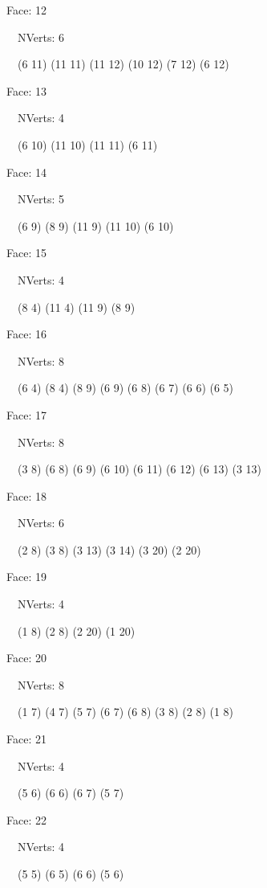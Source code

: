 \documentclass{article}
\begin{document}
{\footnotesize 

Face: 12

\   \    NVerts: 6

 \   \   (6 11) (11 11) (11 12) (10 12) (7 12) (6 12)}

{\footnotesize 

Face: 13

\   \    NVerts: 4

 \   \   (6 10) (11 10) (11 11) (6 11)}

{\footnotesize 

Face: 14

\   \    NVerts: 5

 \   \   (6 9) (8 9) (11 9) (11 10) (6 10)}

{\footnotesize 

Face: 15

\   \    NVerts: 4

 \   \   (8 4) (11 4) (11 9) (8 9)}

{\footnotesize 

Face: 16

\   \    NVerts: 8

 \   \   (6 4) (8 4) (8 9) (6 9) (6 8) (6 7) (6 6) (6 5)}

{\footnotesize 

Face: 17

\   \    NVerts: 8

 \   \   (3 8) (6 8) (6 9) (6 10) (6 11) (6 12) (6 13) (3 13)}

{\footnotesize 

Face: 18

\   \    NVerts: 6

 \   \   (2 8) (3 8) (3 13) (3 14) (3 20) (2 20)}

{\footnotesize 

Face: 19

\   \    NVerts: 4

 \   \   (1 8) (2 8) (2 20) (1 20)}

{\footnotesize 

Face: 20

\   \    NVerts: 8

 \   \   (1 7) (4 7) (5 7) (6 7) (6 8) (3 8) (2 8) (1 8)}

{\footnotesize 

Face: 21

\   \    NVerts: 4

 \   \   (5 6) (6 6) (6 7) (5 7)}

{\footnotesize 

Face: 22

\   \    NVerts: 4

 \   \   (5 5) (6 5) (6 6) (5 6)}
\end{document}
